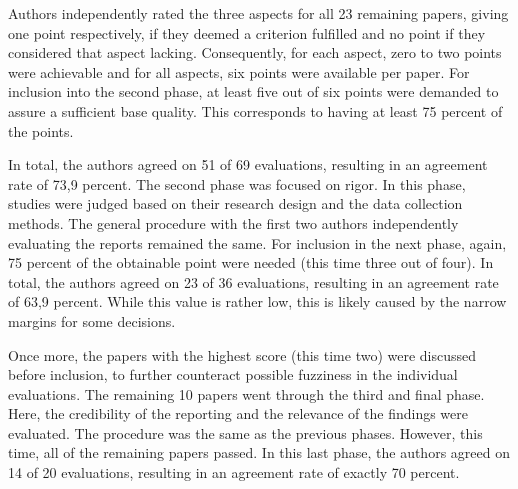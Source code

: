 \documentclass{bmcart}
\begin{document}


Authors independently rated the three aspects for all 23 remaining papers, giving one point respectively, if they deemed a criterion fulfilled and no point if they considered that aspect lacking. Consequently, for each aspect, zero to two points were achievable and for all aspects, six points were available per paper. For inclusion into the second phase, at least five out of six points were demanded to assure a sufficient base quality. This corresponds to having at least 75 percent of the points. 



In total, the authors agreed on 51 of 69 evaluations, resulting in an agreement rate of 73,9 percent. The second phase was focused on rigor. In this phase, studies were judged based on their research design and the data collection methods. The general procedure with the first two authors independently evaluating the reports remained the same. For inclusion in the next phase, again, 75 percent of the obtainable point were needed (this time three out of four). In total, the authors agreed on 23 of 36 evaluations, resulting in an agreement rate of 63,9 percent. While this value is rather low, this is likely caused by the narrow margins for some decisions. 

Once more, the papers with the highest score (this time two) were discussed before inclusion, to further counteract possible fuzziness in the individual evaluations.  The remaining 10 papers went through the third and final phase. Here, the credibility of the reporting and the relevance of the findings were evaluated. The procedure was the same as the previous phases. However, this time, all of the remaining papers passed. In this last phase, the authors agreed on 14 of 20 evaluations, resulting in an agreement rate of exactly 70 percent. 






\end{document}
